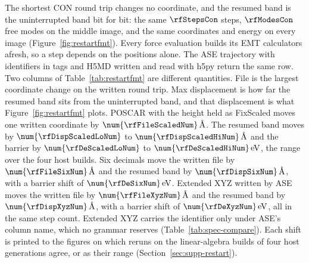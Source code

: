The shortest CON round trip changes no coordinate, and the resumed band
is the uninterrupted band bit for bit: the same \(\rfStepsCon\) steps,
\(\rfModesCon\) free modes on the middle image, and the same coordinates
and energy on every image (Figure~\ref{fig:restartfmt}).
Every force evaluation builds its EMT calculators afresh, so a step
depends on the positions alone.
The ASE trajectory with identifiers in tags and H5MD written and read
with h5py return the same row.
Two columns of Table~\ref{tab:restartfmt} are different quantities.
File is the largest coordinate change on the written round trip.
Max displacement is how far the resumed band sits from the uninterrupted
band, and that displacement is what Figure~\ref{fig:restartfmt} plots.
POSCAR with the height held as FixScaled moves one written coordinate by
\(\num{\rfFileScaledNum}\,\text{\AA}\).
The resumed band moves by \(\num{\rfDispScaledLoNum}\) to
\(\num{\rfDispScaledHiNum}\,\text{\AA}\) and the barrier by
\(\num{\rfDeScaledLoNum}\) to \(\num{\rfDeScaledHiNum}\,\mathrm{eV}\),
the range over the four host builds.
Six decimals move the written file by \(\num{\rfFileSixNum}\,\text{\AA}\)
and the resumed band by \(\num{\rfDispSixNum}\,\text{\AA}\), with a barrier
shift of \(\num{\rfDeSixNum}\,\mathrm{eV}\).
Extended XYZ written by ASE moves the written file by
\(\num{\rfFileXyzNum}\,\text{\AA}\) and the resumed band by
\(\num{\rfDispXyzNum}\,\text{\AA}\), with a barrier shift of
\(\num{\rfDeXyzNum}\,\mathrm{eV}\), all in the same step count.
Extended XYZ carries the identifier only under ASE's column name, which no grammar reserves (Table~\ref{tab:spec-compare}).
Each shift is printed to the figures on which reruns on the
linear-algebra builds of four host generations agree, or as their range
(Section~\ref*{sec:supp-restart}).



